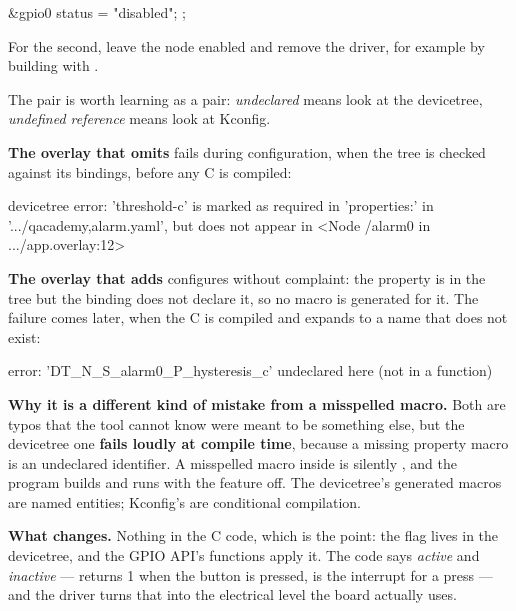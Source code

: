 \begin{dtscode}
&gpio0 {
	status = "disabled";
};
\end{dtscode}

\noindent For the second, leave the node enabled and remove the driver, for example by building with
. 

The pair is worth learning as a pair: \emph{undeclared} means look at the devicetree,
\emph{undefined reference} means look at Kconfig.

\textbf{The overlay that omits } fails during configuration, when the tree is
checked against its bindings, before any C is compiled:

\begin{console}
devicetree error: 'threshold-c' is marked as required in 'properties:' in
'.../qacademy,alarm.yaml', but does not appear in <Node /alarm0 in .../app.overlay:12>
\end{console}

\textbf{The overlay that adds } configures without complaint: the property is in
the tree but the binding does not declare it, so no macro is generated for it. The failure comes
later, when the C is compiled and  expands to a name that does not exist:

\begin{console}
error: 'DT_N_S_alarm0_P_hysteresis_c' undeclared here (not in a function)
\end{console}

\textbf{Why it is a different kind of mistake from a misspelled  macro.} Both are
typos that the tool cannot know were meant to be something else, but the devicetree one
\textbf{fails loudly at compile time}, because a missing property macro is an undeclared
identifier. A misspelled
 macro inside  is silently , and the program builds and
runs with the feature off. The devicetree's generated macros are named entities; Kconfig's are
conditional compilation. 

\textbf{What  changes.} Nothing in the C code, which is the point: the flag
lives in the devicetree, and the GPIO API's  functions apply it. The code says
\emph{active} and \emph{inactive} ---  returns 1 when the button is pressed,
 is the interrupt for a press --- and the driver turns that into the
electrical level the board actually uses. 

